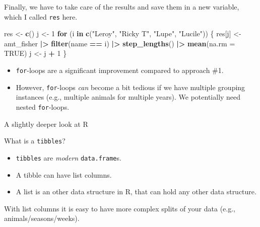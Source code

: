 \documentclass[ignorenonframetext,,t]{beamer}
\let\oldtextbf\textbf
\renewcommand{\textbf}[1]{\textcolor{spamwell}{\oldtextbf{#1}}}
\providecommand{\tightlist}{%
\setlength{\itemsep}{0pt}\setlength{\parskip}{0pt}}
\newenvironment{Shaded}{\begin{snugshade}}{\end{snugshade}}
\newcommand{\AttributeTok}[1]{\textcolor[rgb]{0.13,0.29,0.53}{#1}}
\newcommand{\ConstantTok}[1]{\textcolor[rgb]{0.56,0.35,0.01}{#1}}
\newcommand{\ControlFlowTok}[1]{\textcolor[rgb]{0.13,0.29,0.53}{\textbf{#1}}}
\newcommand{\DecValTok}[1]{\textcolor[rgb]{0.00,0.00,0.81}{#1}}
\newcommand{\FunctionTok}[1]{\textcolor[rgb]{0.13,0.29,0.53}{\textbf{#1}}}
\newcommand{\NormalTok}[1]{#1}
\newcommand{\OtherTok}[1]{\textcolor[rgb]{0.56,0.35,0.01}{#1}}
\newcommand{\SpecialCharTok}[1]{\textcolor[rgb]{0.81,0.36,0.00}{\textbf{#1}}}
\newcommand{\StringTok}[1]{\textcolor[rgb]{0.31,0.60,0.02}{#1}}
\providecommand{\tightlist}{%
\setlength{\itemsep}{0pt}\setlength{\parskip}{0pt}}
\renewcommand{\tightlist}{\setlength{\itemsep}{1.4ex}\setlength{\parskip}{0pt}}
\begin{document}
\begin{frame}[fragile]
Finally, we have to take care of the results and save them in a new
variable, which I called \texttt{res} here.

\begin{Shaded}
\begin{Highlighting}[]
\NormalTok{res }\OtherTok{\textless{}{-}} \FunctionTok{c}\NormalTok{()}
\NormalTok{j }\OtherTok{\textless{}{-}} \DecValTok{1}
\ControlFlowTok{for}\NormalTok{ (i }\ControlFlowTok{in} \FunctionTok{c}\NormalTok{(}\StringTok{"Leroy"}\NormalTok{, }\StringTok{"Ricky T"}\NormalTok{, }\StringTok{"Lupe"}\NormalTok{, }\StringTok{"Lucile"}\NormalTok{)) \{}
\NormalTok{  res[j] }\OtherTok{\textless{}{-}}\NormalTok{ amt\_fisher }\SpecialCharTok{|\textgreater{}} \FunctionTok{filter}\NormalTok{(name }\SpecialCharTok{==}\NormalTok{ i) }\SpecialCharTok{|\textgreater{}} 
    \FunctionTok{step\_lengths}\NormalTok{() }\SpecialCharTok{|\textgreater{}} \FunctionTok{mean}\NormalTok{(}\AttributeTok{na.rm =} \ConstantTok{TRUE}\NormalTok{)}
\NormalTok{  j }\OtherTok{\textless{}{-}}\NormalTok{ j }\SpecialCharTok{+} \DecValTok{1}
\NormalTok{\}}
\end{Highlighting}
\end{Shaded}
\end{frame}

\begin{frame}[fragile]
\begin{itemize}
\tightlist
\item
  \texttt{for}-loops are a significant improvement compared to approach
  \#1.
\item
  However, \texttt{for}-loops \emph{can} become a bit tedious if we have
  multiple grouping instances (e.g., multiple animals for multiple
  years). We potentially need nested \texttt{for}-loops.
\end{itemize}
\end{frame}

\begin{frame}[fragile]{A slightly deeper look at R}
\label{a-slightly-deeper-look-at-r}
\begin{block}{What is a \texttt{tibbles}?}
\label{what-is-a-tibbles}
\begin{itemize}
\tightlist
\item
  \texttt{tibbles} are \emph{modern} \texttt{data.frame}s.
\item
  A tibble can have list columns.
\item
  A list is an other data structure in R, that can hold any other data
  structure.
\end{itemize}

With list columns it is easy to have more complex splits of your data
(e.g., animals/seasons/weeks).
\end{block}
\end{frame}
\end{document}
